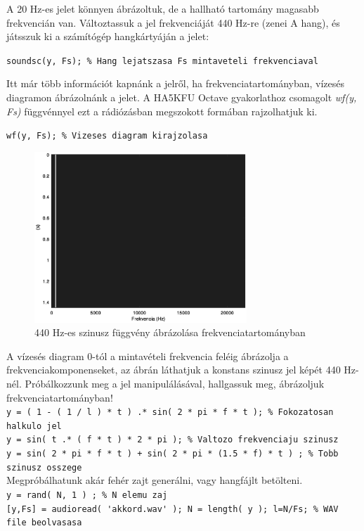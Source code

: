 \documentclass[12pt,a4paper]{article}
\begin{document}
A 20 Hz-es jelet könnyen ábrázoltuk, de a hallható tartomány magasabb frekvencián van. Változtassuk a jel frekvenciáját 440 Hz-re (zenei A hang), és játsszuk ki a számítógép hangkártyáján a jelet:


\lstinline{soundsc(y, Fs); % Hang lejatszasa Fs mintaveteli frekvenciaval } 


Itt már több információt kapnánk a jelről, ha frekvenciatartományban, vízesés diagramon ábrázolnánk a jelet. A HA5KFU Octave gyakorlathoz csomagolt \textit{wf(y, Fs)} függvénnyel ezt a rádiózásban megszokott formában rajzolhatjuk ki. 


\lstinline{wf(y, Fs); % Vizeses diagram kirajzolasa }  


\begin{figure}[H]
\begin{center}
\includegraphics[width=8cm]{figures/modulaciok_workshop_waterfall.eps}
\caption{440 Hz-es szinusz függvény ábrázolása frekvenciatartományban}
\label{fig:waterfall}
\end{center}
\end{figure}

A vízesés diagram 0-tól a mintavételi frekvencia feléig ábrázolja a frekvenciakomponenseket, az ábrán láthatjuk a konstans szinusz jel képét 440 Hz-nél. Próbálkozzunk meg a jel manipulálásával, hallgassuk meg, ábrázoljuk frekvenciatartományban!\\
\lstinline{y = ( 1 - ( 1 / l ) * t ) .* sin( 2 * pi * f * t ); % Fokozatosan halkulo jel } \\
\lstinline{y = sin( t .* ( f * t ) * 2 * pi ); % Valtozo frekvenciaju szinusz } \\
\lstinline{y = sin( 2 * pi * f * t ) + sin( 2 * pi * (1.5 * f) * t ) ; % Tobb szinusz osszege }
\\
Megpróbálhatunk akár fehér zajt generálni, vagy hangfájlt betölteni. \\
\lstinline{y = rand( N, 1 ) ; % N elemu zaj}  \\
\lstinline{[y,Fs] = audioread( 'akkord.wav' ); N = length( y ); l=N/Fs; % WAV file beolvasasa}
\end{document}
